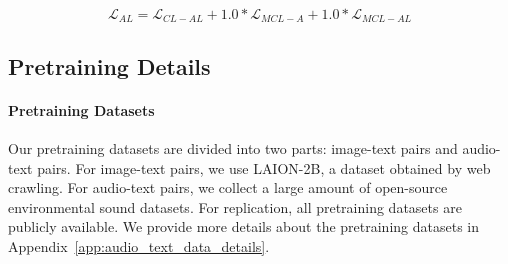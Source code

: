 \begin{equation}
\mathcal{L}_{AL} = \mathcal{L}_{CL-AL} + 1.0*\mathcal{L}_{MCL-A} + 1.0*\mathcal{L}_{MCL-AL}
\end{equation}



\subsection{Pretraining Details}

\paragraph{Pretraining Datasets}
Our pretraining datasets are divided into two parts: image-text pairs and audio-text pairs. 
For image-text pairs, we use LAION-2B, a dataset obtained by web crawling.
For audio-text pairs, we collect a large amount of open-source environmental sound datasets.
For replication, all pretraining datasets are publicly available.
We provide more details about the pretraining datasets in Appendix~\ref{app:audio_text_data_details}.


